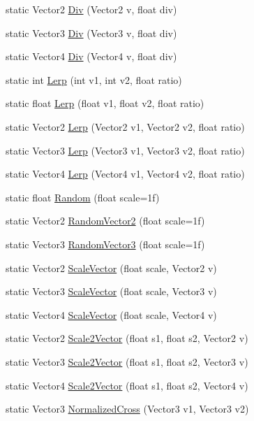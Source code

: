 \begin{DoxyCompactItemize}
\item 
static Vector2 \hyperlink{classi_c_s___math_ac69b1ff1542fcbd156044eaaa01d9433}{Div} (Vector2 v, float div)
\item 
static Vector3 \hyperlink{classi_c_s___math_a79daed83d0a371230719505a36b29447}{Div} (Vector3 v, float div)
\item 
static Vector4 \hyperlink{classi_c_s___math_a826c1a5d845a4aa49ca9fc3176de2c3d}{Div} (Vector4 v, float div)
\item 
static int \hyperlink{classi_c_s___math_a991ee9e3f9bd09fda1f88627e81b46bf}{Lerp} (int v1, int v2, float ratio)
\item 
static float \hyperlink{classi_c_s___math_a78b543002c8ea086be7df0a0b4a531ae}{Lerp} (float v1, float v2, float ratio)
\item 
static Vector2 \hyperlink{classi_c_s___math_a7cb13bbb20565cd8f5491c4487b01b93}{Lerp} (Vector2 v1, Vector2 v2, float ratio)
\item 
static Vector3 \hyperlink{classi_c_s___math_a17d5ecf4dda7320595ed69dde7963a84}{Lerp} (Vector3 v1, Vector3 v2, float ratio)
\item 
static Vector4 \hyperlink{classi_c_s___math_a6520ced4500ec359c96fef7a41148f01}{Lerp} (Vector4 v1, Vector4 v2, float ratio)
\item 
static float \hyperlink{classi_c_s___math_a985c474fef90aa27d6771fa164b5925c}{Random} (float scale=1f)
\item 
static Vector2 \hyperlink{classi_c_s___math_a199a92f47c1ee4e8a73fc1ac3d253f14}{Random\+Vector2} (float scale=1f)
\item 
static Vector3 \hyperlink{classi_c_s___math_a9a4141d452a2ab4fd7825209242b79ba}{Random\+Vector3} (float scale=1f)
\item 
static Vector2 \hyperlink{classi_c_s___math_a6f8c2109fec99695b3e01df963e0a376}{Scale\+Vector} (float scale, Vector2 v)
\item 
static Vector3 \hyperlink{classi_c_s___math_ab44d16701b03ec445353384a4d95e1b4}{Scale\+Vector} (float scale, Vector3 v)
\item 
static Vector4 \hyperlink{classi_c_s___math_a67214f59600abaa04f6fc24b40ecd2f0}{Scale\+Vector} (float scale, Vector4 v)
\item 
static Vector2 \hyperlink{classi_c_s___math_a7d58bfb098b0d442f20bdf8e1fae85ff}{Scale2\+Vector} (float s1, float s2, Vector2 v)
\item 
static Vector3 \hyperlink{classi_c_s___math_ad3111adef1aec8bbb2e9629affce6169}{Scale2\+Vector} (float s1, float s2, Vector3 v)
\item 
static Vector4 \hyperlink{classi_c_s___math_a8b1193ad97a0db82652a684fb7a31800}{Scale2\+Vector} (float s1, float s2, Vector4 v)
\item 
static Vector3 \hyperlink{classi_c_s___math_aac616bb5a7a9285c95f852847b9955b5}{Normalized\+Cross} (Vector3 v1, Vector3 v2)
\end{DoxyCompactItemize}


